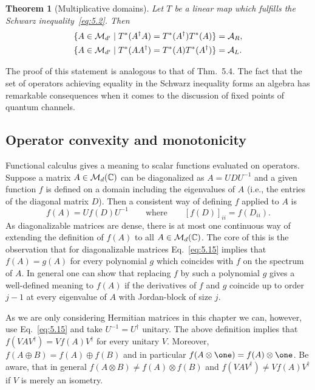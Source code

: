 \documentclass[11pt,a4paper]{article}
\theoremstyle{plain}
\newtheorem{theorem}{Theorem}[section]
\theoremstyle{definition}
\theoremstyle{remark}
\numberwithin{equation}{section}
\begin{document}
\begin{theorem}[Multiplicative domains]
    Let $T$ be a linear map which fulfills the Schwarz inequality~\eqref{eq:5.2}. Then
    \begin{align}
        \{A\in \mathcal{M}_{d'} \mid T^*(A^\dagger A)=T^*(A^\dagger)T^*(A)\} &= \mathcal{A}_R,
        \label{eq:5.13}\\
        \{A\in \mathcal{M}_{d'} \mid T^*(AA^\dagger)=T^*(A)T^*(A^\dagger)\}  &= \mathcal{A}_L.
        \label{eq:5.14}
    \end{align}
\end{theorem}

The proof of this statement is analogous to that of Thm.~5.4. The fact that the set
of operators achieving equality in the Schwarz inequality forms an algebra has
remarkable consequences when it comes to the discussion of fixed points of quantum
channels.

\subsection{Operator convexity and monotonicity}

Functional calculus gives a meaning to scalar functions evaluated on operators.
Suppose a matrix $A\in \mathcal{M}_d(\mathbb{C})$ can be diagonalized as $A=UDU^{-1}$ and a given
function $f$ is defined on a domain including the eigenvalues of $A$ (i.e., the
entries of the diagonal matrix $D$). Then a consistent way of defining $f$ applied to
$A$ is
\begin{equation}\label{eq:5.15}
    f(A) = U f(D) U^{-1}
    \qquad\text{where}\qquad
    [f(D)]_{ii} = f(D_{ii}).
\end{equation}
As diagonalizable matrices are dense, there is at most one continuous way of
extending the definition of $f(A)$ to all $A\in \mathcal{M}_d(\mathbb{C})$. The core of this is the
observation that for diagonalizable matrices Eq.~\eqref{eq:5.15} implies that $f(A)=g(A)$
for every polynomial $g$ which coincides with $f$ on the spectrum of $A$. In general
one can show that replacing $f$ by such a polynomial $g$ gives a well-defined meaning
to $f(A)$ if the derivatives of $f$ and $g$ coincide up to order $j-1$ at every
eigenvalue of $A$ with Jordan-block of size $j$.

As we are only considering Hermitian matrices in this chapter we can, however, use
Eq.~\eqref{eq:5.15} and take $U^{-1}=U^\dagger$ unitary. The above definition implies
that $f(VAV^\dagger)=Vf(A)V^\dagger$ for every unitary $V$. Moreover,
$f(A\oplus B)=f(A)\oplus f(B)$ and in particular $f(A\otimes \one)=f(A)\otimes \one$.
Be aware, that in general $f(A\otimes B)\ne f(A)\otimes f(B)$ and
$f(VAV^\dagger)\ne Vf(A)V^\dagger$ if $V$ is merely an isometry.
\end{document}
